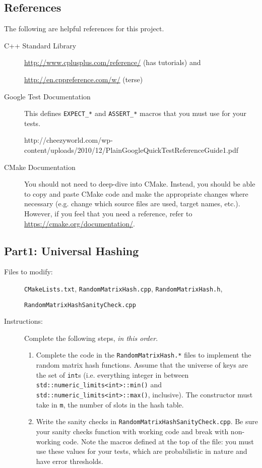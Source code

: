 \documentclass[paper=a4, fontsize=11pt]{scrartcl} %
\numberwithin{equation}{section} %
\numberwithin{figure}{section} %
\numberwithin{table}{section} %
\begin{document}
\subsection*{References}
The following are helpful references for this project.
\begin{description}
	\item[C++ Standard Library] \url{http://www.cplusplus.com/reference/} (has tutorials) and 
	
	\url{http://en.cppreference.com/w/} (terse)
	\item[Google Test Documentation] This defines \texttt{EXPECT\_*} and \texttt{ASSERT\_*} macros that you must use for your tests.
	
	http://cheezyworld.com/wp-content/uploads/2010/12/PlainGoogleQuickTestReferenceGuide1.pdf
	\item[CMake Documentation] You should not need to deep-dive into CMake. Instead, you should be able to copy and paste CMake code and make the appropriate changes where necessary (e.g. change which source files are used, target names, etc.). However, if you feel that you need a reference, refer to \url{https://cmake.org/documentation/}.
\end{description}

\subsection*{Part1: Universal Hashing}
\begin{description}
	\item[Files to modify:] \texttt{CMakeLists.txt}, \texttt{RandomMatrixHash.cpp}, \texttt{RandomMatrixHash.h}, 
	
	\texttt{RandomMatrixHashSanityCheck.cpp}
	\item[Instructions:] 
	
	Complete the following steps, \textit{in this order}.
		\begin{enumerate}
			\item Complete the code in the \texttt{RandomMatrixHash.*} files to implement the random matrix hash functions. Assume that the universe of keys are the set of \texttt{int}s (i.e. everything integer in between \texttt{std::numeric\_limits<int>::min()} and \texttt{std::numeric\_limits<int>::max()}, inclusive). The constructor must take in \texttt{m}, the number of slots in the hash table.
			\item Write the sanity checks in \texttt{RandomMatrixHashSanityCheck.cpp}. Be sure your sanity checks function with working code and break with non-working code. Note the macros defined at the top of the file: you must use these values for your tests, which are probabilistic in nature and have error thresholds.
			\end{enumerate}
\end{description}
\end{document}

